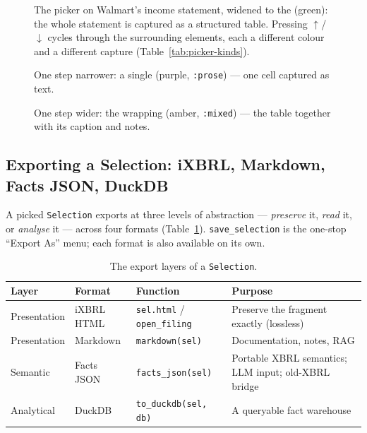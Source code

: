 \documentclass[11pt,a4paper]{report}
\begin{document}
\begin{figure}[h]
\centering
{}
\caption{The picker on Walmart's income statement, widened to the 
(green): the whole statement is captured as a structured table. Pressing
$\uparrow$/$\downarrow$ cycles through the surrounding elements, each a different
colour and a different capture (Table~\ref{tab:picker-kinds}).}
\label{fig:picker-green}
\end{figure}

\begin{figure}[h]
\centering
{}
\caption{One step narrower: a single  (purple, \texttt{:prose}) --- one
cell captured as text.}
\label{fig:picker-td}
\end{figure}

\begin{figure}[h]
\centering
{}
\caption{One step wider: the wrapping  (amber, \texttt{:mixed}) --- the
table together with its caption and notes.}
\label{fig:picker-div}
\end{figure}


\subsection{Exporting a Selection: iXBRL, Markdown, Facts JSON, DuckDB}
\label{sec:export-layers}

A picked \texttt{Selection} exports at three levels of abstraction --- \emph{preserve} it,
\emph{read} it, or \emph{analyse} it --- across four formats (Table~\ref{tab:export-layers}).
\texttt{save\_selection} is the one-stop ``Export As'' menu; each format is also available
on its own.

\begin{table}[h]
\centering
\caption{The export layers of a \texttt{Selection}.}
\label{tab:export-layers}
\begin{tabular}{@{}p{}p{}p{}p{}@{}}
\toprule
\textbf{Layer} & \textbf{Format} & \textbf{Function} & \textbf{Purpose} \\
\midrule
Presentation & iXBRL HTML & \texttt{sel.html} / \texttt{open\_filing} & Preserve the fragment exactly (lossless) \\
Presentation & Markdown & \texttt{markdown(sel)} & Documentation, notes, RAG \\
Semantic & Facts JSON & \texttt{facts\_json(sel)} & Portable XBRL semantics; LLM input; old-XBRL bridge \\
Analytical & DuckDB & \texttt{to\_duckdb(sel, db)} & A queryable fact warehouse \\
\bottomrule
\end{tabular}
\end{table}
\end{document}
